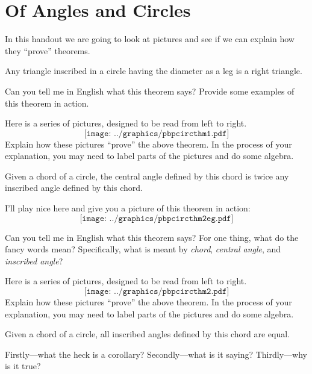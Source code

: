 \newpage
\section{Of Angles and Circles} %

In this handout we are going to look at pictures and see if we can
explain how they ``prove'' theorems.


\begin{thm} 
Any triangle inscribed in a circle having the diameter as a leg is a
right triangle.
\end{thm}

\begin{prob}
Can you tell me in English what this theorem says? Provide some
examples of this theorem in action.
\end{prob}

\begin{prob} 
Here is a series of pictures, designed to be read from left to right.
\[
\texttt{[image: ../graphics/pbpcircthm1.pdf]}
\]
Explain how these pictures ``prove'' the above theorem. In the process
of your explanation, you may need to label parts of the pictures and
do some algebra.
\end{prob}


\begin{thm} 
Given a chord of a circle, the central angle defined by this chord is
twice any inscribed angle defined by this chord.
\end{thm}

I'll play nice here and give you a picture of this theorem in action:
\[
\texttt{[image: ../graphics/pbpcircthm2eg.pdf]}
\]

\begin{prob}
Can you tell me in English what this theorem says? For one thing, what
do the fancy words mean? Specifically, what is meant by
\textit{chord}, \textit{central angle}, and \textit{inscribed angle}?
\end{prob}

\newpage


\begin{prob} 
Here is a series of pictures, designed to be read from left to right.
\[
\texttt{[image: ../graphics/pbpcircthm2.pdf]}
\]
Explain how these pictures ``prove'' the above theorem. In the process
of your explanation, you may need to label parts of the pictures and
do some algebra.
\end{prob}



\begin{cor} 
Given a chord of a circle, all inscribed angles defined by this chord
are equal.
\end{cor}

\begin{prob} 
Firstly---what the heck is a corollary? Secondly---what is it saying?
Thirdly---why is it true?
\end{prob}

